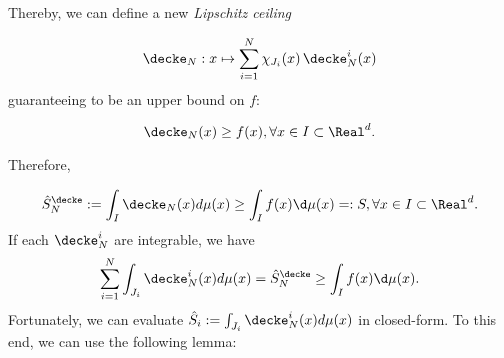 Thereby, we can define a new \textit{Lipschitz ceiling} 

\[\decke_N: x \mapsto \sum_{i=1}^N \chi_{J_i} (x) \, \decke^i_N(x)\]
guaranteeing to be an upper bound on $f$:

\[\decke_N( x) \geq f(x), \forall x \in I \subset \Real^d.\]

Therefore, 

\[\hat S_N^\decke:=\int_I \decke_N( x) d\mu(x) \geq \int_I f(x) \d\mu(x) =: S, \forall x \in I \subset \Real^d.\]
If each $\decke^i_N$ are integrable, we have 
\begin{equation}
\sum_{i=1}^N \int_{J_i} \decke^i_N( x) d\mu(x)=\hat S_N^\decke \geq \int_I f(x) \d\mu(x).
\label{eq:defint_ceiling2}
\end{equation}
Fortunately, we can evaluate $\hat S_i :=\int_{J_i} \decke^i_N( x) d\mu(x)$ in closed-form. To this end, we can use the following lemma:



